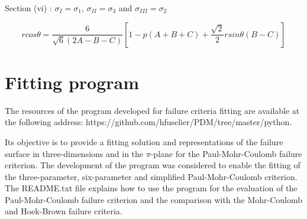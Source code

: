 Section (vi) : $\sigma_I = \sigma_1$, $\sigma_{II} = \sigma_3$ and $\sigma_{III} = \sigma_2$

\begin{equation}
    r cos\theta = \frac{6}{\sqrt{6}(2A-B-C)} \left[ 1-p(A+B+C)+ \frac{\sqrt{2}}{2} r sin \theta (B-C) \right]
\end{equation}


\chapter{Fitting program}\label{App:C}

The resources of the program developed for failure criteria fitting are available at the following address: https://github.com/hfuselier/PDM/tree/master/python.

Its objective is to provide a fitting solution and representations of the failure surface in three-dimensions and in the $\pi$-plane for the Paul-Mohr-Coulomb failure criterion. The development of the program was considered to enable the fitting of the three-parameter, six-parameter and simplified Paul-Mohr-Coulomb criterion. The README.txt file explains how to use the program for the evaluation  of the Paul-Mohr-Coulomb failure criterion and the comparison with the Mohr-Coulomb and Hoek-Brown failure criteria. 

